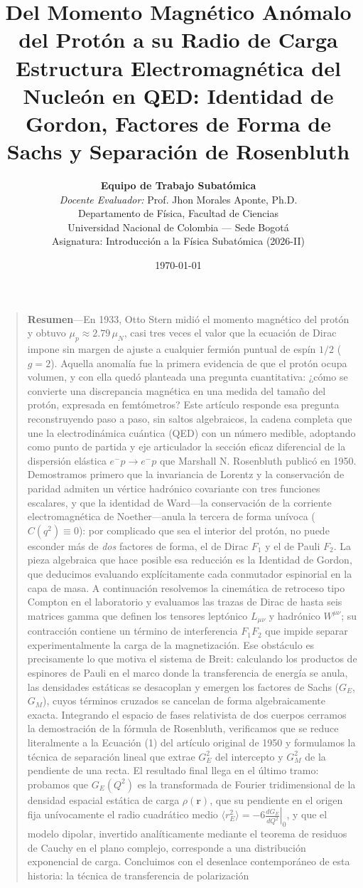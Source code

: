 \documentclass[10pt,a4paper]{article}
\title{\textbf{\Large Del Momento Magnético Anómalo del Protón a su Radio de Carga}\\[1.0ex]
\large Estructura Electromagnética del Nucleón en QED: Identidad de Gordon, Factores de Forma de Sachs y Separación de Rosenbluth}
\author{
    \textbf{Equipo de Trabajo Subatómica}\\[0.5ex]
    \textit{Docente Evaluador:} Prof. Jhon Morales Aponte, Ph.D.\\[0.5ex]
    \small Departamento de Física, Facultad de Ciencias\\
    \small Universidad Nacional de Colombia — Sede Bogotá\\
    \small Asignatura: Introducción a la Física Subatómica (2026-II)
}
\date{\today}
\begin{document}
\maketitle
\vspace{-1.5em}
\begin{quote}
\small
\textbf{Resumen}---En 1933, Otto Stern midió el momento magnético del protón y obtuvo $\mu_p \approx 2.79\,\mu_N$, casi tres veces el valor que la ecuación de Dirac impone sin margen de ajuste a cualquier fermión puntual de espín $1/2$ ($g = 2$). Aquella anomalía fue la primera evidencia de que el protón ocupa volumen, y con ella quedó planteada una pregunta cuantitativa: ¿cómo se convierte una discrepancia magnética en una medida del tamaño del protón, expresada en femtómetros? Este artículo responde esa pregunta reconstruyendo paso a paso, sin saltos algebraicos, la cadena completa que une la electrodinámica cuántica (QED) con un número medible, adoptando como punto de partida y eje articulador la sección eficaz diferencial de la dispersión elástica $e^- p \to e^- p$ que Marshall N. Rosenbluth publicó en 1950. Demostramos primero que la invariancia de Lorentz y la conservación de paridad admiten un vértice hadrónico covariante con tres funciones escalares, y que la identidad de Ward---la conservación de la corriente electromagnética de Noether---anula la tercera de forma unívoca ($C(q^2) \equiv 0$): por complicado que sea el interior del protón, no puede esconder más de \emph{dos} factores de forma, el de Dirac $F_1$ y el de Pauli $F_2$. La pieza algebraica que hace posible esa reducción es la Identidad de Gordon, que deducimos evaluando explícitamente cada conmutador espinorial en la capa de masa. A continuación resolvemos la cinemática de retroceso tipo Compton en el laboratorio y evaluamos las trazas de Dirac de hasta seis matrices gamma que definen los tensores leptónico $L_{\mu\nu}$ y hadrónico $W^{\mu\nu}$; su contracción contiene un término de interferencia $F_1 F_2$ que impide separar experimentalmente la carga de la magnetización. Ese obstáculo es precisamente lo que motiva el sistema de Breit: calculando los productos de espinores de Pauli en el marco donde la transferencia de energía se anula, las densidades estáticas se desacoplan y emergen los factores de Sachs ($G_E$, $G_M$), cuyos términos cruzados se cancelan de forma algebraicamente exacta. Integrando el espacio de fases relativista de dos cuerpos cerramos la demostración de la fórmula de Rosenbluth, verificamos que se reduce literalmente a la Ecuación (1) del artículo original de 1950 y formulamos la técnica de separación lineal que extrae $G_E^2$ del intercepto y $G_M^2$ de la pendiente de una recta. El resultado final llega en el último tramo: probamos que $G_E(Q^2)$ es la transformada de Fourier tridimensional de la densidad espacial estática de carga $\rho(\mathbf{r})$, que su pendiente en el origen fija unívocamente el radio cuadrático medio $\langle r_E^2 \rangle = -6 \left.\frac{dG_E}{dQ^2}\right|_0$, y que el modelo dipolar, invertido analíticamente mediante el teorema de residuos de Cauchy en el plano complejo, corresponde a una distribución exponencial de carga. Concluimos con el desenlace contemporáneo de esta historia: la técnica de transferencia de polarización 
\end{quote}
\end{document}

